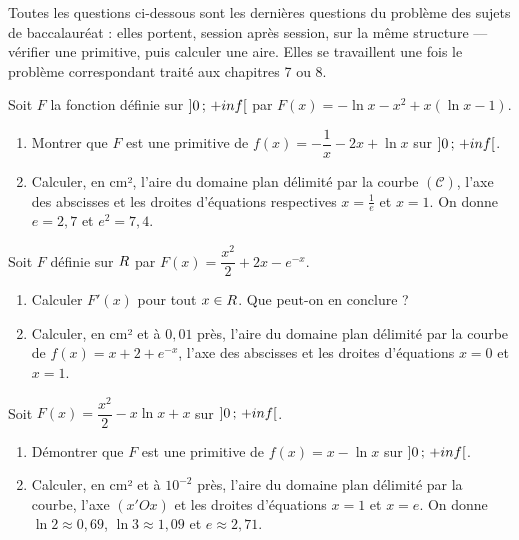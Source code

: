 \begin{annales}
Toutes les questions ci-dessous sont les dernières questions du problème des
sujets de baccalauréat : elles portent, session après session, sur la même
structure — vérifier une primitive, puis calculer une aire. Elles se
travaillent une fois le problème correspondant traité aux chapitres 7 ou 8.

Soit $F$ la fonction définie sur $\left]0\,;\,+inf\right[$ par
$F(x) = -\ln x-x^{2}+x\left(\ln x-1\right)$.
\begin{enumerate}[label=\textbf{\alph*)}, leftmargin=*, itemsep=0.15em]
  \item Montrer que $F$ est une primitive de
        $f(x) = -\dfrac1x-2x+\ln x$ sur $\left]0\,;\,+inf\right[$.
  \item Calculer, en cm², l'aire du domaine plan délimité par la courbe
        $(\mathcal C)$, l'axe des abscisses et les droites d'équations
        respectives $x = \frac1e$ et $x = 1$. On donne $e = 2{,}7$ et
        $e^{2} = 7{,}4$.
\end{enumerate}

Soit $F$ définie sur $R$ par $F(x) = \dfrac{x^{2}}{2}+2x-e^{-x}$.
\begin{enumerate}[label=\textbf{\alph*)}, leftmargin=*, itemsep=0.15em]
  \item Calculer $F'(x)$ pour tout $x \in R$. Que peut-on en conclure ?
  \item Calculer, en cm² et à $0{,}01$ près, l'aire du domaine plan délimité
        par la courbe de $f(x) = x+2+e^{-x}$, l'axe des abscisses et les
        droites d'équations $x = 0$ et $x = 1$.
\end{enumerate}

Soit $F(x) = \dfrac{x^{2}}{2}-x\ln x+x$ sur $\left]0\,;\,+inf\right[$.
\begin{enumerate}[label=\textbf{\alph*)}, leftmargin=*, itemsep=0.15em]
  \item Démontrer que $F$ est une primitive de $f(x) = x-\ln x$ sur
        $\left]0\,;\,+inf\right[$.
  \item Calculer, en cm² et à $10^{-2}$ près, l'aire du domaine plan
        délimité par la courbe, l'axe $(x'Ox)$ et les droites d'équations
        $x = 1$ et $x = e$. On donne $\ln2 \approx 0{,}69$,
        $\ln3 \approx 1{,}09$ et $e \approx 2{,}71$.
\end{enumerate}


\end{annales}
